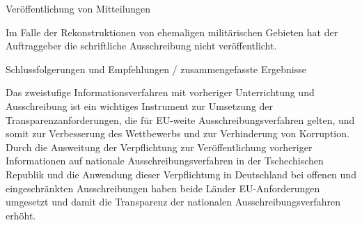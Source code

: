 \documentclass[10pt]{article}
\begin{document}
Veröffentlichung von Mitteilungen

Im Falle der Rekonstruktionen von ehemaligen militärischen Gebieten hat der Auftraggeber die schriftliche Ausschreibung nicht veröffentlicht.


Schlussfolgerungen und Empfehlungen / zusammengefasste Ergebnisse

Das zweistufige Informationsverfahren mit vorheriger Unterrichtung und Ausschreibung ist ein wichtiges Instrument zur Umsetzung der Transparenzanforderungen, die für EU-weite Ausschreibungsverfahren gelten, und somit zur Verbesserung des Wettbewerbs und zur Verhinderung von Korruption.
Durch die Ausweitung der Verpflichtung zur Veröffentlichung vorheriger Informationen auf nationale Ausschreibungsverfahren in der Tschechischen Republik und die Anwendung dieser Verpflichtung in Deutschland bei offenen und eingeschränkten Ausschreibungen haben beide Länder EU-Anforderungen umgesetzt und damit die Transparenz der nationalen Ausschreibungsverfahren erhöht.
\end{document}
